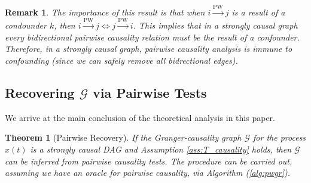 \documentclass{statsoc}
\def\pwgc{\overset{\text{PW}}{\rightarrow}}  %
\def\gcg{\mathcal{G}}  %
\newtheorem{theorem}{Theorem}
\newtheorem{remark}{Remark}
\begin{document}
\begin{remark}
  The importance of this result is that when $i \pwgc j$ is a result
  of a condounder $k$, then $i \pwgc j \iff j \pwgc i$.  This
  implies that in a strongly causal graph every bidirectional pairwise
  causality relation must be the result of a confounder.  Therefore,
  in a strongly causal graph, pairwise causality analysis is
  \textit{immune to confounding} (since we can safely remove all
  bidrectional edges).
\end{remark}

\subsection{Recovering $\gcg$ via Pairwise Tests}
\label{sec:pairwise_algorithm}
We arrive at the main conclusion of the theoretical analysis in this
paper.

\begin{theorem}[Pairwise Recovery]
  \label{thm:scg_recovery}
  If the Granger-causality graph $\gcg$ for the process $x(t)$ is a
  strongly causal DAG and Assumption \ref{ass:T_causality} holds, then
  $\gcg$ can be inferred from pairwise causality tests.  The procedure
  can be carried out, assuming we have an oracle for pairwise
  causality, via Algorithm (\ref{alg:pwgr}).
\end{theorem}
\end{document}
